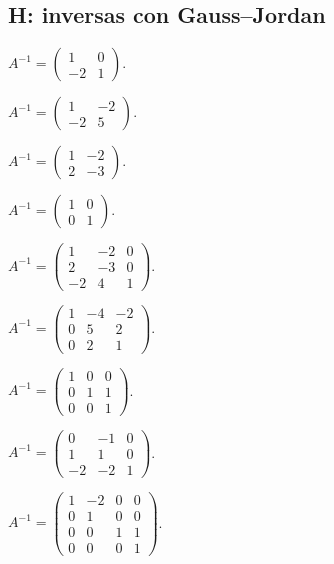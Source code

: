 \documentclass[12pt]{article}
\theoremstyle{remark}
\begin{document}
\subsection*{H: inversas con Gauss--Jordan}
\begin{description}[style=nextline,leftmargin=3em,itemsep=0.45em]
\item[E127.] $A^{-1}=\begin{pmatrix}1&0\\-2&1\end{pmatrix}$.
\item[E128.] $A^{-1}=\begin{pmatrix}1&-2\\-2&5\end{pmatrix}$.
\item[E129.] $A^{-1}=\begin{pmatrix}1&-2\\2&-3\end{pmatrix}$.
\item[E130.] $A^{-1}=\begin{pmatrix}1&0\\0&1\end{pmatrix}$.
\item[E131.] $A^{-1}=\begin{pmatrix}1&-2&0\\2&-3&0\\-2&4&1\end{pmatrix}$.
\item[E132.] $A^{-1}=\begin{pmatrix}1&-4&-2\\0&5&2\\0&2&1\end{pmatrix}$.
\item[E133.] $A^{-1}=\begin{pmatrix}1&0&0\\0&1&1\\0&0&1\end{pmatrix}$.
\item[E134.] $A^{-1}=\begin{pmatrix}0&-1&0\\1&1&0\\-2&-2&1\end{pmatrix}$.
\item[E135.] $A^{-1}=\begin{pmatrix}1&-2&0&0\\0&1&0&0\\0&0&1&1\\0&0&0&1\end{pmatrix}$.

\end{description}
\end{document}
